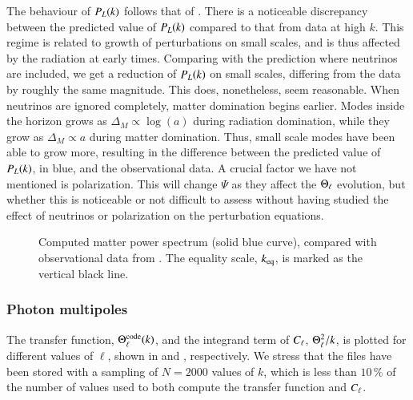 The behaviour of $P_L(k)$ follows that of . There is a noticeable discrepancy between the predicted value of $P_L(k)$ compared to that from data at high $k$. This regime is related to growth of perturbations on small scales, and is thus affected by the radiation at early times. Comparing with the prediction where neutrinos are included, we get a reduction of $P_L(k)$ on small scales, differing from the data by roughly the same magnitude. This does, nonetheless, seem reasonable. When neutrinos are ignored completely, matter domination begins earlier. Modes inside the horizon grows as $\Delta_M\propto\log(a)$ during radiation domination, while they grow as $\Delta_M\propto a$ during matter domination. Thus, small scale modes have been able to grow more, resulting in the difference between the predicted value of $P_L(k)$, in blue, and the observational data. A crucial factor we have not mentioned is polarization. This will change $\Psi$ as they affect the $\Theta_\ell$ evolution, but whether this is noticeable or not difficult to assess without having studied the effect of neutrinos or polarization on the perturbation equations.       
\begin{figure}[ht!]
    \caption{Computed matter power spectrum (solid blue curve), compared with observational data from . The equality scale, $k_\mathrm{eq}$, is marked as the vertical black line.}
    \label{fig:M4:results:matterPS_nk2000Neff}
\end{figure}





\subsubsection{Photon multipoles} \label{sssec:M4:results:photons_multipoles}
The transfer function, $\Theta_\ell^\mathrm{code}(k)$, and the integrand term of $C_\ell$, $\Theta_\ell^2/k$, is plotted for different values of $\ell$, shown in  and , respectively. We stress that the files have been stored with a sampling of $N=2000$ values of $k$, which is less than $10\,\%$ of the number of values used to both compute the transfer function and $C_\ell$.  

